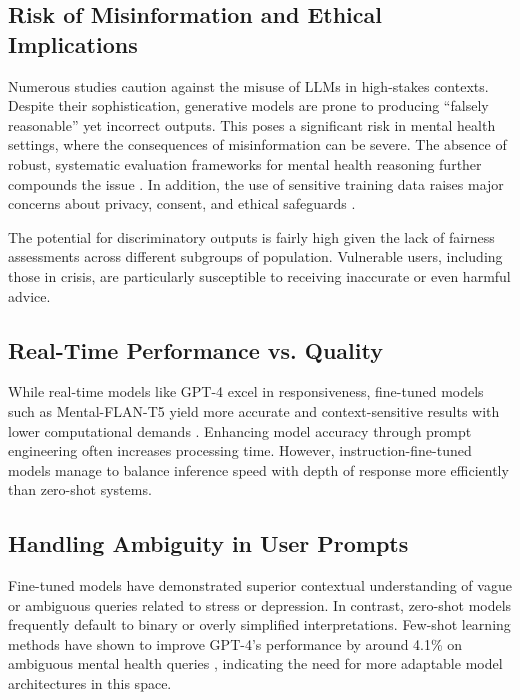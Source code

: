 \subsection{Risk of Misinformation and Ethical Implications}

Numerous studies caution against the misuse of LLMs in high-stakes contexts. Despite their sophistication, generative models are prone to producing “falsely reasonable” yet incorrect outputs. This poses a significant risk in mental health settings, where the consequences of misinformation can be severe. The absence of robust, systematic evaluation frameworks for mental health reasoning further compounds the issue \cite{greco2023}. In addition, the use of sensitive training data raises major concerns about privacy, consent, and ethical safeguards \cite{arriba2024}.

The potential for discriminatory outputs is fairly high given the lack of fairness assessments across different subgroups of population. Vulnerable users, including those in crisis, are particularly susceptible to receiving inaccurate or even harmful advice.

\subsection{Real-Time Performance vs. Quality}

While real-time models like GPT-4 excel in responsiveness, fine-tuned models such as Mental-FLAN-T5 yield more accurate and context-sensitive results with lower computational demands \cite{xu2024}. Enhancing model accuracy through prompt engineering often increases processing time. However, instruction-fine-tuned models manage to balance inference speed with depth of response more efficiently than zero-shot systems.

\subsection{Handling Ambiguity in User Prompts}

Fine-tuned models have demonstrated superior contextual understanding of vague or ambiguous queries related to stress or depression. In contrast, zero-shot models frequently default to binary or overly simplified interpretations. Few-shot learning methods have shown to improve GPT-4’s performance by around 4.1\% on ambiguous mental health queries \cite{xu2024}, indicating the need for more adaptable model architectures in this space.

